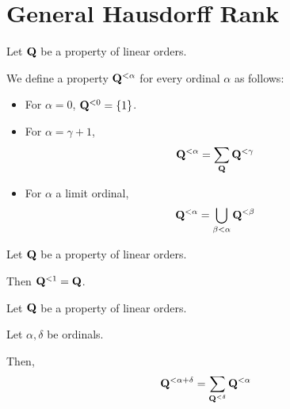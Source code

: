 
\section{General Hausdorff Rank}

\begin{definition}
  Let $\mathbf{Q}$ be a property of linear orders.

  We define a property $\mathbf{Q}^{< \alpha}$
  for every ordinal $\alpha$ as follows:

  \begin{itemize}
    \item For $\alpha = 0$, $\mathbf{Q}^{< 0} = \left\{ {1} \right\}$.
    \item For $\alpha = \gamma + 1$,
          \[\mathbf{Q}^{< \alpha} = \sum_{\mathbf{Q}}{\mathbf{Q}^{< \gamma}}\]
    \item For $\alpha$ a limit ordinal,
          \[\mathbf{Q}^{< \alpha} = \bigcup_{\beta < \alpha} \mathbf{Q}^{< \beta}\]
  \end{itemize}
\end{definition}

\begin{example}
  Let $\mathbf{Q}$ be a property of linear orders.

  Then $\mathbf{Q}^{< 1} = \mathbf{Q}$.
\end{example}

\begin{lemma}\label{sum-of-ranks}
  Let $\mathbf{Q}$ be a property of linear orders.

  Let $\alpha, \delta$ be ordinals.

  Then,
  \[
    \mathbf{Q}^{< \alpha + \delta}
    = \sum_{\mathbf{Q}^{< \delta}}{\mathbf{Q}^{< \alpha}}
  \]
\end{lemma}

